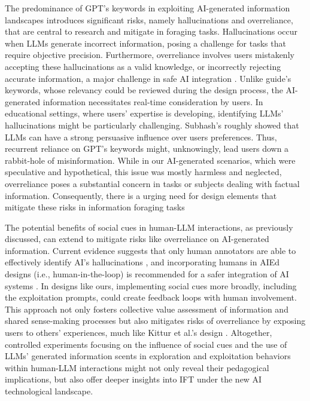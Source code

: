 \documentclass[sn-mathphys, Numbered]{sn-jnl}%
\theoremstyle{thmstyleone}%
\theoremstyle{thmstyletwo}%
\theoremstyle{thmstylethree}%
\begin{document}
The predominance of GPT's keywords in exploiting AI-generated information landscapes introduces significant risks, namely hallucinations and overreliance, that are central to research and mitigate in foraging tasks. Hallucinations occur when LLMs generate incorrect information, posing a challenge for tasks that require objective precision. Furthermore, overreliance involves users mistakenly accepting these hallucinations as a valid knowledge, or incorrectly rejecting accurate information, a major challenge in safe AI integration \parencite{bubeck_sparks_2023, maynez_faithfulness_2020}. Unlike guide's keywords, whose relevancy could be reviewed during the design process, the AI-generated information necessitates real-time consideration by users. In educational settings, where users' expertise is developing, identifying LLMs' hallucinations might be particularly challenging. Subhash's \parencite*{subhash_can_2023} roughly showed that LLMs can have a strong persuasive influence over users preferences. Thus, recurrent reliance on GPT's keywords might, unknowingly, lead users down a rabbit-hole of misinformation. While in our AI-generated scenarios, which were speculative and hypothetical, this issue was mostly harmless and neglected, overreliance poses a substantial concern in tasks or subjects dealing with factual information. Consequently, there is a urging need for design elements that mitigate these risks in information foraging tasks

The potential benefits of social cues in human-LLM interactions, as previously discussed, can extend to mitigate risks like overreliance on AI-generated information. Current evidence suggests that only human annotators are able to effectively identify AI's hallucinations \parencite{maynez_faithfulness_2020}, and incorporating humans in AIEd designs (i.e., human-in-the-loop) is recommended for a safer integration of AI systems \parencite{bommasani_opportunities_2022, cardona_artificial_2023}. In designs like ours, implementing social cues more broadly, including the exploitation prompts, could create feedback loops with human involvement. This approach not only fosters collective value assessment of information and shared sense-making processes but also mitigates risks of overreliance by exposing users to others' experiences, much like Kittur et al.'s design \parencite*{kittur_standing_2014}. Altogether, controlled experiments focusing on the influence of social cues and the use of LLMs' generated information scents in exploration and exploitation behaviors within human-LLM interactions might not only reveal their pedagogical implications, but also offer deeper insights into IFT under the new AI technological landscape.
\end{document}
